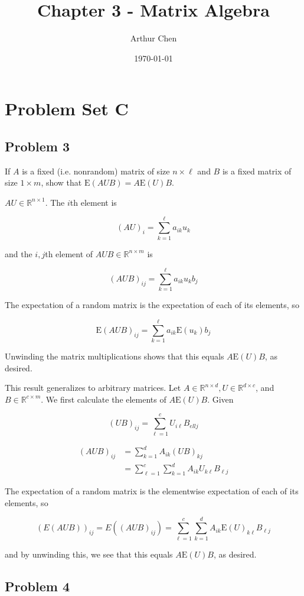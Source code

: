 \documentclass{article}
\author{Arthur Chen}
\title{Chapter 3 - Matrix Algebra}
\date{\today}
\newcommand{\R}{\mathbb{R}}
\newcommand{\E}{\text{E}}
\begin{document}
\maketitle

\section*{Problem Set C}

\subsection*{Problem 3}

If $A$ is a fixed (i.e. nonrandom) matrix of size $n \times \ell$ and $B$ is a fixed matrix of size $1 \times m$, show that $\E(AUB) = A\E(U)B$.

$AU \in \R^{n \times 1}$. The $i$th element is

\[
(AU)_i = \sum_{k=1}^\ell a_{ik}u_k
\]

and the $i,j$th element of $AUB \in \R^{n \times m}$ is

\[
(AUB)_{ij} = \sum_{k=1}^\ell a_{ik}u_k b_j
\]

The expectation of a random matrix is the expectation of each of its elements, so

\[
\E(AUB)_{ij} = \sum_{k=1}^\ell a_{ik} \E(u_k) b_j
\]

Unwinding the matrix multiplications shows that this equals $A\E(U)B$, as desired.

This result generalizes to arbitrary matrices. Let $A \in \R^{n \times d}, U \in \R^{d \times c}$, and $B \in \R^{c \times m}$. We first calculate the elements of $A\E(U)B$. Given

\[
(UB)_{ij} = \sum_{\ell = 1}^c U_{i \ell}B_{ell j}
\]

\begin{align*}
(AUB)_{ij} &= \sum_{k=1}^d A_{ik}(UB)_{kj} \\
&= \sum_{\ell = 1}^c \sum_{k=1}^d A_{ik} U_{k \ell}B_{\ell j}
\end{align*}

The expectation of a random matrix is the elementwise expectation of each of its elements, so

\[
(E(AUB))_{ij} = E((AUB)_{ij}) = \sum_{\ell = 1}^c \sum_{k=1}^d A_{ik} \E(U)_{k \ell}B_{\ell j}
\]

and by unwinding this, we see that this equals $A\E(U)B$, as desired.

\subsection*{Problem 4}
\end{document}
